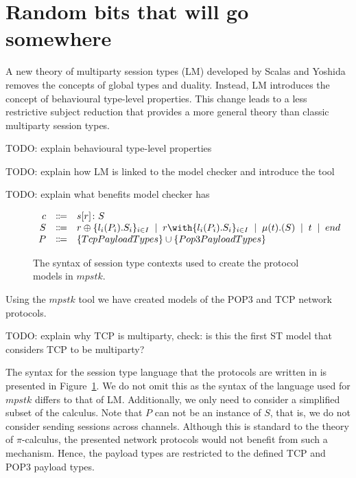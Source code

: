 \documentclass{article}
\newcommand{\todo}[1]{}
\renewcommand{\todo}[1]{{\color{red} TODO: {#1}}}
\newcommand{\sep}{\;\mid\;}
\begin{document}
\section{Random bits that will go somewhere}

A new theory of multiparty session types (LM) developed by Scalas and Yoshida~\cite{SY19} removes the concepts of global types and duality.
Instead, LM introduces the concept of behavioural type-level properties.
This change leads to a less restrictive subject reduction that provides a more general theory than classic multiparty session types.

\todo{explain behavioural type-level properties}

\todo{explain how LM is linked to the model checker and introduce the tool}

\todo{explain what benefits model checker has}


\begin{figure}[H]
    \centering
        $
        \begin{array}{rcl}
        \ensuremath{c}
            & \Coloneqq & \ensuremath{s[r] \colon S} \cr
        \ensuremath{S}
            & \Coloneqq & \ensuremath{r \oplus \{l_i(P_i).S_i\}_{i \in I}}
            \sep        \ensuremath{r \with \{l_i(P_i).S_i\}_{i \in I}}
            \sep        \ensuremath{\mu(t).(S)}
            \sep        \ensuremath{t}
            \sep        \ensuremath{end} \cr
        \ensuremath{P}
            & \Coloneqq & \ensuremath{\{TcpPayloadTypes\} \cup \{Pop3PayloadTypes\}}
        \end{array}
        $
    \caption{The syntax of session type contexts used to create the protocol models in \ensuremath{mpstk}.}
    \label{fig:syntax}
\end{figure}

Using the \ensuremath{mpstk} tool we have created models of the POP3 and TCP network protocols.

\todo{explain why TCP is multiparty, check: is this the first ST model that considers TCP to be multiparty?}

The syntax for the session type language that the protocols are written in is presented in Figure~\ref{fig:syntax}.
We do not omit this as the syntax of the language used for \ensuremath{mpstk} differs to that of LM.
Additionally, we only need to consider a simplified subset of the calculus.
Note that \ensuremath{P} can not be an instance of \ensuremath{S}, that is, we do not consider sending sessions across channels.
Although this is standard to the theory of \ensuremath{\pi}-calculus, the presented network protocols would not benefit from such a mechanism.
Hence, the payload types are restricted to the defined TCP and POP3 payload types.

\medskip
\nocite{*}
\printbibliography
\end{document}
